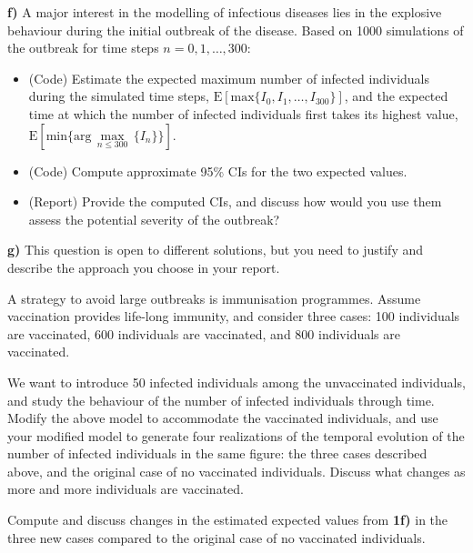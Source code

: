 \documentclass[1p]{article}		%
\begin{document}
\noindent
\textbf{f)} A major interest in the modelling of infectious diseases lies in the explosive behaviour 
during the initial outbreak of the disease. 
Based on 1000 simulations of the outbreak for time steps $n = 0, 1,\ldots, 300$:
\begin{itemize}
  \item (Code) Estimate the expected maximum number of infected individuals during
  the simulated time steps, $\mathrm{E}[\text{max}\{I_0, I_1, \ldots, I_{300}\}]$, and the expected time at which the number of infected individuals
first takes its highest value, $\mathrm{E}[\text{min} \{\text{arg}\,\max\limits_{n \leq 300}\,\{I_n\}\}]$.
  \item
    (Code) Compute approximate 95\% CIs for the two expected values.
  \item
    (Report) Provide the computed CIs, and discuss how would you use them assess the potential severity of the outbreak?
\end{itemize}
\vspace{0.1cm}

\noindent
\textbf{g)} This question is open to different solutions, but you need to justify and describe the approach you choose in your report.

 A strategy to avoid large outbreaks is immunisation programmes. Assume vaccination
provides life-long immunity, and consider three cases: 100 individuals are vaccinated, 600
individuals are vaccinated, and 800 individuals are vaccinated. 

We want to introduce 50 infected individuals among the unvaccinated individuals, and study the behaviour of the number of infected individuals through time. Modify the above model to accommodate the vaccinated individuals, and use your modified
model to generate four realizations of the temporal evolution of the number
of infected individuals in the same figure: the three cases described above,
and the original case of no vaccinated individuals. Discuss what changes as more
and more individuals are vaccinated.

Compute and discuss changes in the estimated expected values 
from \textbf{1f)} in the three new cases
compared to the original case of no vaccinated individuals.
\end{document}
